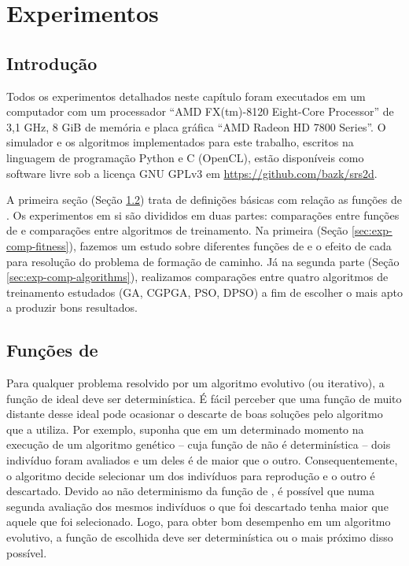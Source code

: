 \chapter{Experimentos}
\label{cha:experiments}

\section{Introdução}

Todos os experimentos detalhados neste capítulo foram executados em um computador com um processador ``AMD FX(tm)-8120 Eight-Core Processor'' de 3,1 GHz, 8 GiB de memória e placa gráfica ``AMD Radeon HD 7800 Series''. O simulador e os algoritmos implementados para este trabalho, escritos na linguagem de programação Python e C (OpenCL), estão disponíveis como software livre sob a licença GNU GPLv3 em \url{https://github.com/bazk/srs2d}.

A primeira seção (Seção \ref{sec:exp-fitness}) trata de definições básicas com relação as funções de \fitness. Os experimentos em si são divididos em duas partes: comparações entre funções de \fitness e comparações entre algoritmos de treinamento. Na primeira (Seção \ref{sec:exp-comp-fitness}), fazemos um estudo sobre diferentes funções de \fitness e o efeito de cada para resolução do problema de formação de caminho. Já na segunda parte (Seção \ref{sec:exp-comp-algorithms}), realizamos comparações entre quatro algoritmos de treinamento estudados (GA, CGPGA, PSO, DPSO) a fim de escolher o mais apto a produzir bons resultados.


\section{Funções de \fitness}
\label{sec:exp-fitness}

Para qualquer problema resolvido por um algoritmo evolutivo (ou iterativo), a função de \fitness ideal deve ser determinística. É fácil perceber que uma função de \fitness muito distante desse ideal pode ocasionar o descarte de boas soluções pelo algoritmo que a utiliza. Por exemplo, suponha que em um determinado momento na execução de um algoritmo genético -- cuja função de \fitness não é determinística -- dois indivíduo foram avaliados e um deles é de maior \fitness que o outro. Consequentemente, o algoritmo decide selecionar um dos indivíduos para reprodução e o outro é descartado. Devido ao não determinismo da função de \fitness, é possível que numa segunda avaliação dos mesmos indivíduos o que foi descartado tenha maior \fitness que aquele que foi selecionado. Logo, para obter bom desempenho em um algoritmo evolutivo, a função de \fitness escolhida deve ser determinística ou o mais próximo disso possível.


